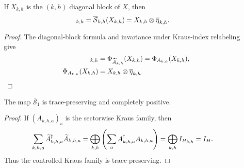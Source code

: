 \begin{lemma}
    \label{thm:mpdo_completed_eta_controlled_map_same_block}
    \leanok
    If $X_{k,h}$ is the $(k,h)$ diagonal block of $X$, then
    \begin{align}
        [\overline{\mathcal S}_1(X)]_{k,h}
         & =\overline{\mathcal S}_{k,h}(X_{k,h})
        =X_{k,h}\otimes\overline\eta_{k,h}. \notag
    \end{align}
\end{lemma}
\begin{proof}
    \leanok

    The diagonal-block formula and invariance under Kraus-index relabeling give
    \begin{align}
        [\overline{\mathcal S}_1(X)]_{k,h}
         & =\Phi_{\widetilde A_{k,h}}(X_{k,h})
        =\Phi_{A_{k,h}}(X_{k,h}), \notag              \\
        \Phi_{A_{k,h}}(X_{k,h})
         & =X_{k,h}\otimes\overline\eta_{k,h}. \notag
    \end{align}
\end{proof}

\begin{lemma}
    \label{thm:mpdo_completed_eta_controlled_map_cptp}
    \leanok
    The map $\overline{\mathcal S}_1$ is trace-preserving and completely
    positive.
\end{lemma}
\begin{proof}
    \leanok
    If $(A_{k,h,a})_a$ is the sectorwise Kraus family, then
    \begin{align}
        \sum_{k,h,a}\widetilde A_{k,h,a}^{\dagger}\widetilde A_{k,h,a}
         & =\bigoplus_{k,h}\left(\sum_a A_{k,h,a}^{\dagger}A_{k,h,a}\right)
        =\bigoplus_{k,h}I_{H_{k,h}}=I_H. \notag
    \end{align}
    Thus the controlled Kraus family is trace-preserving.
\end{proof}

